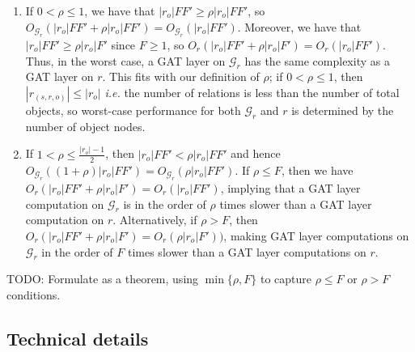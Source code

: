 \begin{enumerate}
    \item If \(0 < \rho \leq 1\), we have that \(|r_o|FF' \geq \rho|r_o|FF'\), so \(O_{\mathcal{G}_r}(|r_o|FF' + \rho|r_o|FF') = O_{\mathcal{G}_r}(|r_o|FF')\). Moreover, we have that \(|r_o|FF' \geq \rho|r_o|F'\) since \(F \geq 1\), so \(O_r(|r_o|FF' + \rho|r_o|F') = O_r(|r_o|FF')\). Thus, in the worst case, a GAT layer on \(\mathcal{G}_r\) has the same complexity as a GAT layer on \(r\). This fits with our definition of \(\rho\); if \(0 < \rho \leq 1\), then \(|r_{(s,r,o)}| \leq |r_o|\) \textit{i.e.} the number of relations is less than the number of total objects, so worst-case performance for both \(\mathcal{G}_r\) and \(r\) is determined by the number of object nodes.
    \item If \(1 < \rho \leq \frac{|r_o| - 1}{2}\), then \(|r_o|FF' < \rho|r_o|FF'\)
    and hence \(O_{\mathcal{G}_r}((1 + \rho)|r_o|FF') = O_{\mathcal{G}_r}(\rho|r_o|FF')\). If \(\rho \leq F\), then we have \(O_r(|r_o|FF' + \rho|r_o|F') = O_r(|r_o|FF')\), implying that a GAT layer computation on \(\mathcal{G}_r\) is in the order of \(\rho\) times slower than a GAT layer computation on \(r\). Alternatively, if \(\rho > F\), then \(O_r(|r_o|FF' + \rho|r_o|F') = O_r(\rho|r_o|F'))\), making GAT layer computations on \(\mathcal{G}_r\) in the order of \(F\) times slower than a GAT layer computations on \(r\).
\end{enumerate}

{\color{red} TODO: Formulate as a theorem, using \(\min\{\rho, F\}\) to capture \(\rho \leq F\) or \(\rho > F\) conditions.}

\subsection{Technical details}
\label{sec:scene_graph_embedding_details}

